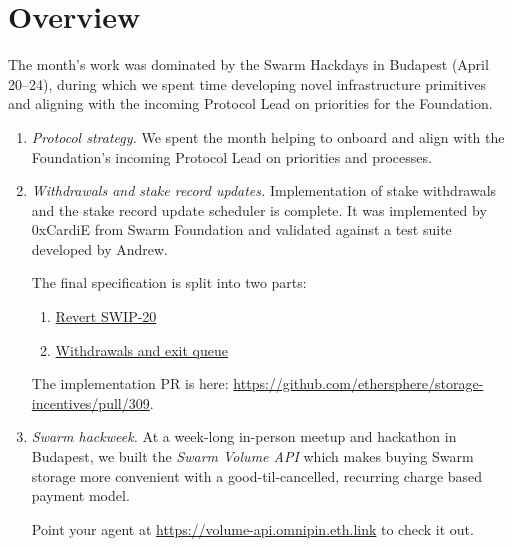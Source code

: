 \maketitle
\section*{Overview}

The month's work was dominated by the Swarm Hackdays in Budapest (April 20–24), during which we spent time developing novel infrastructure primitives and aligning with the incoming Protocol Lead on priorities for the Foundation.

\begin{enumerate}
  \item \emph{Protocol strategy.}
    We spent the month helping to onboard and align with the Foundation's incoming Protocol Lead on priorities and processes.

  \item \emph{Withdrawals and stake record updates.} 
    Implementation of stake withdrawals and the stake record update scheduler is complete. It was implemented by 0xCardiE from Swarm Foundation and validated against a test suite developed by Andrew.

    The final specification is split into two parts:
    \begin{enumerate}
      \item \href{https://github.com/awmacpherson/SWIPs/blob/return-to-single-parameter-stake-record/SWIPs/swip-return-to-single-parameter-stake-record.md}{Revert SWIP-20}
      \item \href{https://github.com/awmacpherson/SWIPs/blob/swip-40-41-combined/SWIPs/swip-40\%2B41.md}{Withdrawals and exit queue}
    \end{enumerate}

    The implementation PR is here: \url{https://github.com/ethersphere/storage-incentives/pull/309}.

  \item \emph{Swarm hackweek.}
    At a week-long in-person meetup and hackathon in Budapest, we built the \emph{Swarm Volume API} which makes buying Swarm storage more convenient with a good-til-cancelled, recurring charge based payment model.

    Point your agent at \url{https://volume-api.omnipin.eth.link} to check it out.

\end{enumerate}

